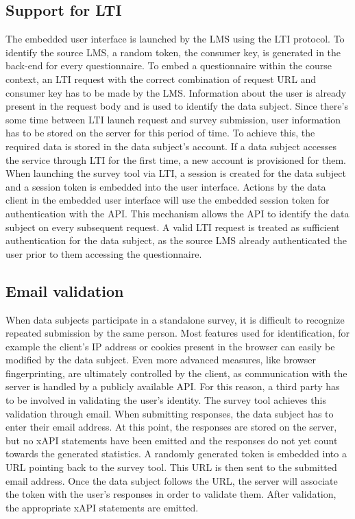 \subsection{Support for LTI}
\label{section:concept:lti}
    The embedded user interface is launched by the LMS using the LTI protocol.
    To identify the source LMS, a random token, the consumer key,
    is generated in the back-end for every questionnaire. To
    embed a questionnaire within the course context, an LTI request
    with the correct combination of request URL and consumer
    key has to be made by the LMS.
    Information about the user is already present in the
    request body and is used to identify the data subject. 
    Since there's some time between LTI launch request
    and survey submission, user information
    has to be stored on the server for this period of time.
    To achieve this, the required data is stored in the data subject's account.
    If a data subject accesses the service through LTI for the first time, 
    a new account is provisioned for them.
    When launching the survey tool via LTI, a session is created
    for the data subject and a session token is embedded into
    the user interface. Actions by the data client in the
    embedded user interface will use the embedded session token
    for authentication with the API. This mechanism allows
    the API to identify the data subject on every subsequent
    request. A valid LTI request is treated as sufficient
    authentication for the data subject, as the source LMS already
    authenticated the user prior to them accessing the questionnaire.

\subsection{Email validation}
    When data subjects participate in a standalone survey,
    it is difficult to recognize repeated submission by the same
    person. Most features used for identification, for example the client's
    IP address or cookies present in the browser can easily be
    modified by the data subject. Even more
    advanced measures, like browser fingerprinting, are ultimately
    controlled by the client, as communication with the server
    is handled by a publicly available API. For this reason,
    a third party has to be involved in validating the user's identity.
    The survey tool achieves this validation through email.
    When submitting responses, the data subject has to enter their
    email address. At this point, the responses are stored on the server,
    but no xAPI statements have been emitted and the responses do not
    yet count towards the generated statistics. 
    A randomly generated token is embedded into a URL pointing back to the survey tool. 
    This URL is then sent to the submitted email address. 
    Once the data subject follows the URL, the server will associate the 
    token with the user's responses in order to validate them.
    After validation, the appropriate xAPI statements are emitted.

